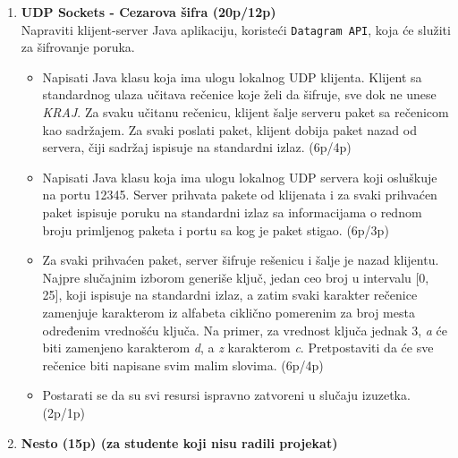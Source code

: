 \documentclass[]{article}
\begin{document}
\begin{enumerate}
\item \textbf{UDP Sockets - Cezarova šifra (20p/12p)}
\\Napraviti klijent-server Java aplikaciju, koristeći \texttt{Datagram API}, koja će služiti za šifrovanje poruka.
\begin{itemize}
  \item Napisati Java klasu koja ima ulogu lokalnog UDP klijenta. Klijent sa standardnog ulaza učitava rečenice koje želi da šifruje, sve dok ne unese \textit{KRAJ}. Za svaku učitanu rečenicu, klijent šalje serveru paket sa rečenicom kao sadržajem. Za svaki poslati paket, klijent dobija paket nazad od servera, čiji sadržaj ispisuje na standardni izlaz. \hfill (6p/4p)
  \item Napisati Java klasu koja ima ulogu lokalnog UDP servera koji osluškuje na portu 12345. Server prihvata pakete od klijenata i za svaki prihvaćen paket ispisuje poruku na standardni izlaz sa informacijama o rednom broju primljenog paketa i portu sa kog je paket stigao. \hfill (6p/3p)
  \item Za svaki prihvaćen paket, server šifruje rešenicu i šalje je nazad klijentu. Najpre slučajnim izborom generiše ključ, jedan ceo broj u intervalu [0, 25], koji ispisuje na standardni izlaz, a zatim svaki karakter rečenice zamenjuje karakterom iz alfabeta ciklično pomerenim za broj mesta određenim vrednošću ključa. Na primer, za vrednost ključa jednak 3, \textit{a} će biti zamenjeno karakterom \textit{d}, a \textit{z} karakterom \textit{c}. Pretpostaviti da će sve rečenice biti napisane svim malim slovima. \hfill (6p/4p)
  \item Postarati se da su svi resursi ispravno zatvoreni u slučaju izuzetka. \hfill (2p/1p)
\end{itemize}

\vspace{15pt}

\item \textbf{Nesto (15p) (za studente koji nisu radili projekat)}


\end{enumerate}
\end{document}
